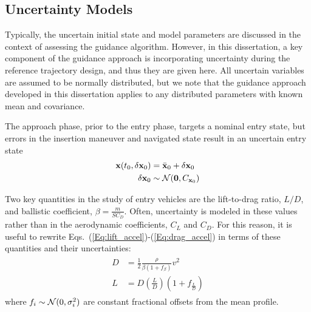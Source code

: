 \subsection{Uncertainty Models}
Typically, the uncertain initial state and model parameters are discussed in the context of assessing the guidance algorithm. However, in this dissertation, a key component of the guidance approach is incorporating uncertainty during the reference trajectory design, and thus they are given here. All uncertain variables are assumed to be normally distributed, but we note that the guidance approach developed in this dissertation applies to any distributed parameters with known mean and covariance. 

The approach phase, prior to the entry phase, targets a nominal entry state, but errors in the insertion maneuver and navigated state result in an uncertain entry state
\begin{align}
	\mathbf{x}(t_0, \delta\mathbf{x}_0) &= \bar{\mathbf{x}}_0 + \delta\mathbf{x}_0 \\
	\delta\mathbf{x}_0 &\sim \mathcal{N}(\mathbf{0}, C_{\mathbf{x}_0}) \nonumber
\end{align}

Two key quantities in the study of entry vehicles are the lift-to-drag ratio, $L/D$, and ballistic coefficient, $\beta = \frac{m}{SC_D}$. Often, uncertainty is modeled in these values rather than in the aerodynamic coefficients, $C_L$ and $C_D$. For this reason, it is useful to rewrite Eqs.~(\ref{Eq:lift_accel})-(\ref{Eq:drag_accel}) in terms of these quantities and their uncertainties:
\begin{align}
	\begin{split}
		D &= \frac{1}{2}\frac{\rho}{\beta(1 + f_{\beta})} v^2 \\
		L &= D(\frac{L}{D})(1+f_{\frac{L}{D}})  \label{Eq:aero_accels}
	\end{split}
\end{align}
where $f_i\sim\mathcal{N}(0, \sigma^2_i)$ are constant fractional offsets from the mean profile.

